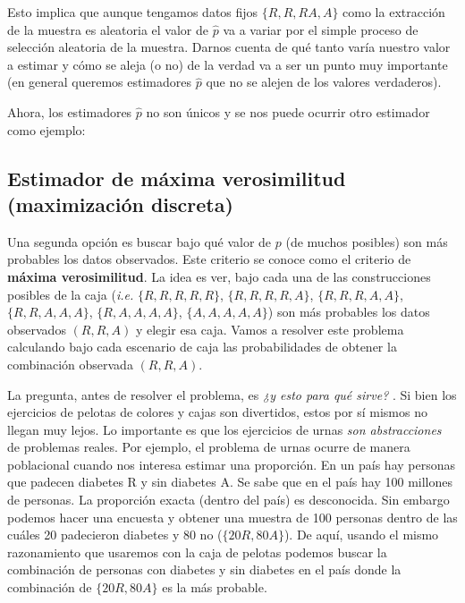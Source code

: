 \documentclass[
]{book}
\begin{document}
Esto implica que aunque tengamos datos fijos \(\{ R,R,R A, A\}\) como la extracción de la muestra es aleatoria el valor de \(\hat{p}\) va a variar por el simple proceso de selección aleatoria de la muestra. Darnos cuenta de qué tanto varía nuestro valor a estimar y cómo se aleja (o no) de la verdad va a ser un punto muy importante (en general queremos estimadores \(\hat{p}\) que no se alejen de los valores verdaderos).

Ahora, los estimadores \(\hat{p}\) no son únicos y se nos puede ocurrir otro estimador como ejemplo:

\hypertarget{estimador-de-muxe1xima-verosimilitud-maximizaciuxf3n-discreta}{%
\subsection{Estimador de máxima verosimilitud (maximización discreta)}\label{estimador-de-muxe1xima-verosimilitud-maximizaciuxf3n-discreta}}

Una segunda opción es buscar bajo qué valor de \(p\) (de muchos posibles) son más probables los datos observados. Este criterio se conoce como el criterio de \textbf{máxima verosimilitud}. La idea es ver, bajo cada una de las construcciones posibles de la caja (\emph{i.e.} \(\{ R, R, R, R, R\}\), \(\{ R, R, R, R, A\}\), \(\{ R, R, R, A, A\}\), \(\{ R, R, A, A, A\}\), \(\{ R, A, A, A, A\}\), \(\{ A, A, A, A, A\}\)) son más probables los datos observados \(( R, R, A)\) y elegir esa caja.
Vamos a resolver este problema calculando bajo cada escenario de caja las probabilidades de obtener la combinación observada \(( R, R, A)\).

La pregunta, antes de resolver el problema, es \emph{¿y esto para qué sirve?} . Si bien los ejercicios de pelotas de colores y cajas son divertidos, estos por sí mismos no llegan muy lejos. Lo importante es que los ejercicios de urnas \emph{son abstracciones} de problemas reales. Por ejemplo, el problema de urnas ocurre de manera poblacional cuando nos interesa estimar una proporción. En un país hay personas que padecen diabetes R y sin diabetes A. Se sabe que en el país hay 100 millones de personas. La proporción exacta (dentro del país) es desconocida. Sin embargo podemos hacer una encuesta y obtener una muestra de 100 personas dentro de las cuáles 20 padecieron diabetes y 80 no (\(\{20 R, 80 A\}\)). De aquí, usando el mismo razonamiento que usaremos con la caja de pelotas podemos buscar la combinación de personas con diabetes y sin diabetes en el país donde la combinación de \(\{20 R, 80 A\}\) es la más probable.
\end{document}
